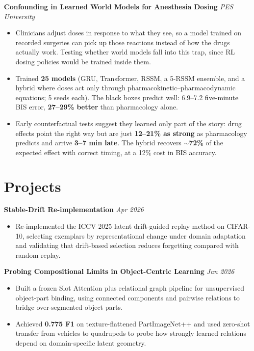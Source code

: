 \documentclass[10pt,a4paper]{article}
\newcommand{\entrygap}{\vspace{5pt}\needspace{4\baselineskip}}
\begin{document}
\textbf{Confounding in Learned World Models for Anesthesia Dosing} 
\hfill \textit{PES University}
\begin{itemize}
  \item Clinicians adjust doses in response to what they see, so a model trained on recorded surgeries can pick up those reactions instead of how the drugs actually work. Testing whether world models fall into this trap, since RL dosing policies would be trained inside them.
  \item Trained \textbf{25 models} (GRU, Transformer, RSSM, a 5-RSSM ensemble, and a hybrid where doses act only through pharmacokinetic--pharmacodynamic equations; 5 seeds each). The black boxes predict well: 6.9--7.2 five-minute BIS error, \textbf{27--29\% better} than pharmacology alone.
  \item Early counterfactual tests suggest they learned only part of the story: drug effects point the right way but are just \textbf{12--21\% as strong} as pharmacology predicts and arrive \textbf{3--7 min late}. The hybrid recovers $\sim$\textbf{72\%} of the expected effect with correct timing, at a 12\% cost in BIS accuracy.
\end{itemize}

\section{Projects}

\textbf{Stable-Drift Re-implementation}  \hfill \textit{Apr 2026}
\begin{itemize}
  \item Re-implemented the ICCV 2025 latent drift-guided replay method on CIFAR-10, selecting exemplars by representational change under domain adaptation and validating that drift-based selection reduces forgetting compared with random replay.
\end{itemize}
\entrygap

\textbf{Probing Compositional Limits in Object-Centric Learning}  \hfill \textit{Jan 2026}
\begin{itemize}
  \item Built a frozen Slot Attention plus relational graph pipeline for unsupervised object-part binding, using connected components and pairwise relations to bridge over-segmented object parts.
  \item Achieved \textbf{0.775 F1} on texture-flattened PartImageNet++ and used zero-shot transfer from vehicles to quadrupeds to probe how strongly learned relations depend on domain-specific latent geometry.
\end{itemize}
\entrygap
\end{document}
